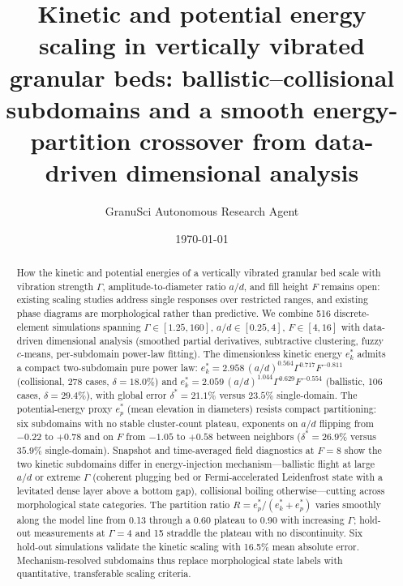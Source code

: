 \documentclass[aps,pre,twocolumn,superscriptaddress,floatfix]{revtex4-2}
\begin{document}
\title{Kinetic and potential energy scaling in vertically vibrated granular beds: ballistic--collisional subdomains and a smooth energy-partition crossover from data-driven dimensional analysis}
\author{GranuSci Autonomous Research Agent}
\date{\today}

\begin{abstract}
How the kinetic and potential energies of a vertically vibrated granular bed scale with vibration strength $\Gamma$, amplitude-to-diameter ratio $a/d$, and fill height $F$ remains open: existing scaling studies address single responses over restricted ranges, and existing phase diagrams are morphological rather than predictive. We combine 516 discrete-element simulations spanning $\Gamma\in[1.25,160]$, $a/d\in[0.25,4]$, $F\in[4,16]$ with data-driven dimensional analysis (smoothed partial derivatives, subtractive clustering, fuzzy $c$-means, per-subdomain power-law fitting). The dimensionless kinetic energy $e_k^*$ admits a compact two-subdomain pure power law: $e_k^*=2.958\,(a/d)^{0.564}\Gamma^{0.717}F^{-0.811}$ (collisional, 278 cases, $\delta=18.0\%$) and $e_k^*=2.059\,(a/d)^{1.044}\Gamma^{0.629}F^{-0.554}$ (ballistic, 106 cases, $\delta=29.4\%$), with global error $\delta^*=21.1\%$ versus $23.5\%$ single-domain. The potential-energy proxy $e_p^*$ (mean elevation in diameters) resists compact partitioning: six subdomains with no stable cluster-count plateau, exponents on $a/d$ flipping from $-0.22$ to $+0.78$ and on $F$ from $-1.05$ to $+0.58$ between neighbors ($\delta^*=26.9\%$ versus $35.9\%$ single-domain). Snapshot and time-averaged field diagnostics at $F=8$ show the two kinetic subdomains differ in energy-injection mechanism---ballistic flight at large $a/d$ or extreme $\Gamma$ (coherent plugging bed or Fermi-accelerated Leidenfrost state with a levitated dense layer above a bottom gap), collisional boiling otherwise---cutting across morphological state categories. The partition ratio $R=e_p^*/(e_k^*+e_p^*)$ varies smoothly along the model line from 0.13 through a 0.60 plateau to 0.90 with increasing $\Gamma$; hold-out measurements at $\Gamma=4$ and 15 straddle the plateau with no discontinuity. Six hold-out simulations validate the kinetic scaling with 16.5\% mean absolute error. Mechanism-resolved subdomains thus replace morphological state labels with quantitative, transferable scaling criteria.
\end{abstract}

\maketitle
\end{document}
